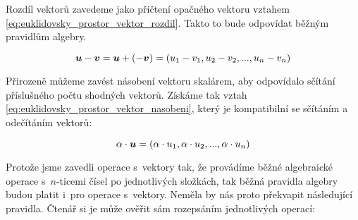 Rozdíl vektorů zavedeme jako přičtení opačného vektoru vztahem \eqref{eq:euklidovsky_prostor_vektor_rozdil}. Takto to bude odpovídat běžným pravidlům algebry.

\begin{equation}
\label{eq:euklidovsky_prostor_vektor_rozdil}
\boldsymbol{u} - \boldsymbol{v} = \boldsymbol{u} + (-\boldsymbol{v})= (u_1 - v_1, u_2 - v_2, ..., u_n - v_n)
\end{equation}

Přirozeně můžeme zavést násobení vektoru skalárem, aby odpovídalo sčítání příslušného počtu shodných vektorů. Získáme tak vztah \eqref{eq:euklidovsky_prostor_vektor_nasobeni}, který je kompatibilní se sčítáním a odečítáním vektorů:

\begin{equation}
\label{eq:euklidovsky_prostor_vektor_nasobeni}
\alpha \cdot \boldsymbol{u} = (\alpha \cdot u_1, \alpha \cdot u_2, ..., \alpha \cdot u_n)
\end{equation}


Protože jsme zavedli operace s~vektory tak, že provádíme běžné algebraické operace s~\(n\)-ticemi čísel po jednotlivých složkách, tak běžná pravidla algebry budou platit i~pro operace s~vektory. Neměla by nás proto překvapit následující pravidla. Čtenář si je může ověřit sám rozepsáním jednotlivých operací:

